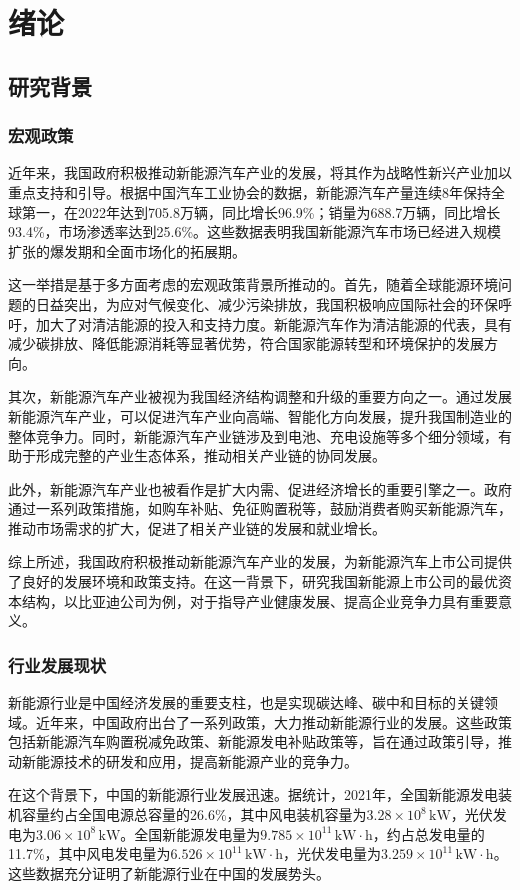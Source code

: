 \chapter{绪论}
\section{研究背景}
\subsection{宏观政策}
近年来，我国政府积极推动新能源汽车产业的发展，将其作为战略性新兴产业加以重点支持和引导。根据中国汽车工业协会的数据，新能源汽车产量连续8年保持全球第一，在2022年达到705.8万辆，同比增长96.9\%；销量为688.7万辆，同比增长93.4\%，市场渗透率达到25.6\%。这些数据表明我国新能源汽车市场已经进入规模扩张的爆发期和全面市场化的拓展期。

这一举措是基于多方面考虑的宏观政策背景所推动的。首先，随着全球能源环境问题的日益突出，为应对气候变化、减少污染排放，我国积极响应国际社会的环保呼吁，加大了对清洁能源的投入和支持力度。新能源汽车作为清洁能源的代表，具有减少碳排放、降低能源消耗等显著优势，符合国家能源转型和环境保护的发展方向。

其次，新能源汽车产业被视为我国经济结构调整和升级的重要方向之一。通过发展新能源汽车产业，可以促进汽车产业向高端、智能化方向发展，提升我国制造业的整体竞争力。同时，新能源汽车产业链涉及到电池、充电设施等多个细分领域，有助于形成完整的产业生态体系，推动相关产业链的协同发展。

此外，新能源汽车产业也被看作是扩大内需、促进经济增长的重要引擎之一。政府通过一系列政策措施，如购车补贴、免征购置税等，鼓励消费者购买新能源汽车，推动市场需求的扩大，促进了相关产业链的发展和就业增长。

综上所述，我国政府积极推动新能源汽车产业的发展，为新能源汽车上市公司提供了良好的发展环境和政策支持。在这一背景下，研究我国新能源上市公司的最优资本结构，以比亚迪公司为例，对于指导产业健康发展、提高企业竞争力具有重要意义。

\subsection{行业发展现状}
新能源行业是中国经济发展的重要支柱，也是实现碳达峰、碳中和目标的关键领域。近年来，中国政府出台了一系列政策，大力推动新能源行业的发展。这些政策包括新能源汽车购置税减免政策、新能源发电补贴政策等，旨在通过政策引导，推动新能源技术的研发和应用，提高新能源产业的竞争力。

在这个背景下，中国的新能源行业发展迅速。据统计，2021年，全国新能源发电装机容量约占全国电源总容量的26.6\%，其中风电装机容量为$3.28 \times 10^{8} \, \text{kW}$，光伏发电为$3.06 \times 10^{8} \, \text{kW}$。全国新能源发电量为$9.785 \times 10^{11} \, \text{kW} \cdot \text{h}$，约占总发电量的11.7\%，其中风电发电量为$6.526\times 10^{11} \, \text{kW} \cdot \text{h}$，光伏发电量为$3.259 \times 10^{11} \, \text{kW} \cdot \text{h}$。这些数据充分证明了新能源行业在中国的发展势头。\cite{Dong2022}

